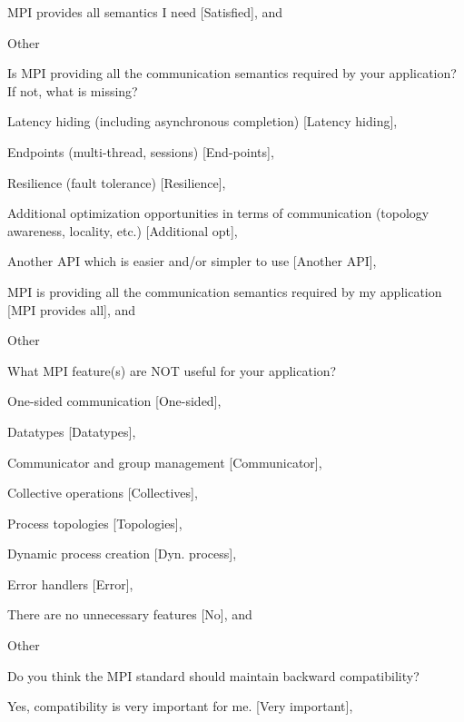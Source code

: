 \documentclass[preprint,5p,times]{elsarticle}
\begin{document}
{{\begin{description}
\begin{inparaenum}[{\bf C}1)]
    \item MPI provides all semantics I need [Satisfied], and
    \item Other
    \end{inparaenum}
  \item[Q26*:] Is MPI providing all the communication semantics required
    by your application? If not, what is missing?
    \begin{inparaenum}[{\bf C}1)]
    \item Latency hiding (including asynchronous completion) [Latency hiding],
    \item Endpoints (multi-thread, sessions) [End-points],
    \item Resilience (fault tolerance) [Resilience],
    \item Additional optimization opportunities in terms of communication
      (topology awareness, locality, etc.) [Additional opt],
    \item Another API which is easier and/or simpler to use [Another API],
    \item MPI is providing all the communication semantics required by my
      application [MPI provides all], and
    \item Other
    \end{inparaenum}
  \item[Q27*:] What MPI feature(s) are NOT useful for your application?
    \begin{inparaenum}[{\bf C}1)]
    \item One-sided communication [One-sided],
    \item Datatypes [Datatypes],
    \item Communicator and group management [Communicator],
    \item Collective operations [Collectives],
    \item Process topologies [Topologies],
    \item Dynamic process creation [Dyn. process],
    \item Error handlers [Error],
    \item There are no unnecessary features [No], and
    \item Other
    \end{inparaenum}
  \item[Q28:] Do you think the MPI standard should maintain backward
    compatibility?
    \begin{inparaenum}[{\bf C}1)]
    \item Yes, compatibility is very important for me. [Very important],

\end{inparaenum}
\end{description}}}
\end{document}
